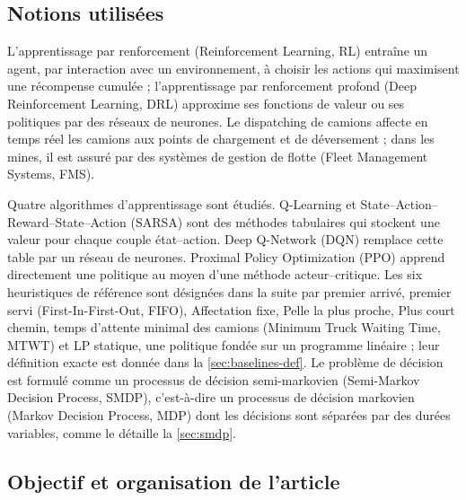 \documentclass[11pt,a4paper]{article}
\newif\ifrevmarks
\newcommand{\revtag}[1]{\ifrevmarks\textsuperscript{\textcolor{red!70!black}{\scriptsize[#1]}}\fi}
\newcommand{\rev}[2]{\ifrevmarks{\color{revcolor}#2}\revtag{#1}\else#2\fi}
\newenvironment{revbloc}[1]{\par\ifrevmarks\color{revcolor}\noindent\revtag{#1}\ \fi}{\par}
\newif\ifcorrmarks
\newcommand{\corr}[1]{\ifcorrmarks\textcolor{corrcolor}{#1}\else#1\fi}
\begin{document}
\subsection{Notions utilisées}

\begin{revbloc}{m3, m4}
\corr{L'apprentissage par renforcement (Reinforcement Learning, RL) entraîne un agent, par interaction avec un environnement, à choisir les actions qui maximisent une récompense cumulée ; l'apprentissage par renforcement profond (Deep Reinforcement Learning, DRL) approxime ses fonctions de valeur ou ses politiques par des réseaux de neurones. Le dispatching de camions affecte en temps réel les camions aux points de chargement et de déversement ; dans les mines, il est assuré par des systèmes de gestion de flotte (Fleet Management Systems, FMS).}

Quatre algorithmes d'apprentissage sont étudiés. Q-Learning et State--Action--Reward--State--Action (SARSA) sont des méthodes tabulaires qui stockent une valeur pour chaque couple état--action. Deep Q-Network (DQN) remplace cette table par un réseau de neurones. Proximal Policy Optimization (PPO) apprend directement une politique au moyen d'une méthode acteur--critique. \rev{T31}{Les six heuristiques de référence sont désignées dans la suite par premier arrivé, premier servi (First-In-First-Out, FIFO), Affectation fixe, Pelle la plus proche, Plus court chemin, temps d'attente minimal des camions (Minimum Truck Waiting Time, MTWT) et \corr{LP statique}, une politique fondée sur un programme linéaire ;} leur définition exacte est donnée dans la \cref{sec:baselines-def}. \corr{Le problème de décision est formulé comme un processus de décision semi-markovien (Semi-Markov Decision Process, SMDP), c'est-à-dire un processus de décision markovien (Markov Decision Process, MDP) dont les décisions sont séparées par des durées variables}, comme le détaille la \cref{sec:smdp}.
\end{revbloc}

\subsection{Objectif et organisation de l'article}
\end{document}
